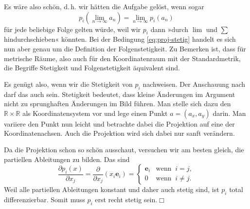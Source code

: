 \documentclass[a4paper,10pt,fleqn,twoside]{scrartcl}
\numberwithin{equation}{section}
\newcommand{\R}{\mathbb R}
\theoremstyle{Aufgabe}
\begin{document}
Es wäre also schön, d.\,h. wir hätten die Aufgabe gelöst, wenn
sogar
\begin{equation}\label{eq:proj-stetig}
p_i(\lim_{n\to\infty} a_n) = \lim_{n\to\infty} p_i(a_n)
\end{equation}
für jede beliebige Folge gelten würde, weil wir $p_i$ dann
»durch $\lim$ und $\sum$ hindurchschieben« könnten. Bei der Bedingung
\eqref{eq:proj-stetig} handelt es sich nun aber genau um die
Definition der Folgenstetigkeit. Zu Bemerken ist, dass für metrische
Räume, also auch für den Koordinatenraum mit der Standardmetrik,
die Begriffe Stetigkeit und Folgenstetigkeit äquivalent sind.

Es genügt also, wenn wir die Stetigkeit von $p_i$ nachweisen.
Der Anschauung nach darf das auch sein. Stetigkeit bedeutet, dass
kleine Änderungen im Argument nicht zu sprunghaften Änderungen im
Bild führen. Man stelle sich dazu den $\R\times\R$ als
Koordinatensystem vor und lege einen Punkt $a=(a_x,a_y)$ darin.
Man variiere den Punkt nun leicht und betrachte dabei die Projektion
auf eine der Koordinatenachsen. Auch die Projektion wird sich dabei
nur sanft verändern.

Da die Projektion schon so schön ausschaut, versuchen wir am besten
gleich, die partiellen Ableitungen zu bilden. Das sind
\begin{equation}
\frac{\partial p_i(x)}{\partial x_j}
= \frac{\partial}{\partial x_j}(x_i\mathbf e_i) =
\begin{cases}
\mathbf e_i &\text{wenn}\;\; i=j,\\
0 &\text{wenn}\;\; i\ne j.
\end{cases}
\end{equation}
Weil alle partiellen Ableitungen konstant und daher auch stetig
sind, ist $p_i$ total differenzierbar. Somit muss $p_i$ erst
recht stetig sein.\;$\Box$
\end{document}
